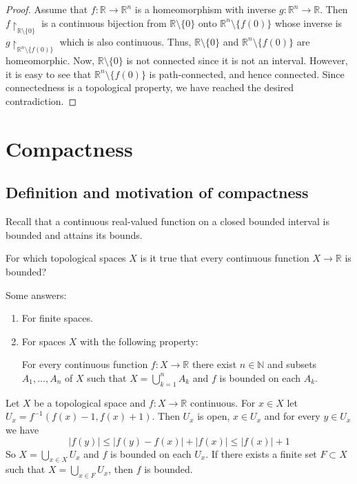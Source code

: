 \documentclass[a4paper]{article}
\begin{document}
\begin{proof}
    Assume that $f: \mathbb{R} \rightarrow \mathbb{R}^{n}$ is a homeomorphism with inverse $g: \mathbb{R}^{n} \rightarrow \mathbb{R}$. Then $f\restriction_{\mathbb{R} \setminus\{0\}}$ is a continuous bijection from $\mathbb{R} \setminus\{0\}$ onto $\mathbb{R}^{n} \setminus\{f(0)\}$ whose inverse is $g\restriction_{\mathbb{R}^{n} \setminus\{f(0)\}}$ which is also continuous. Thus, $\mathbb{R} \setminus\{0\}$ and $\mathbb{R}^{n} \setminus\{f(0)\}$ are homeomorphic. Now, $\mathbb{R} \setminus\{0\}$ is not connected since it is not an interval. However, it is easy to see that $\mathbb{R}^{n} \setminus\{f(0)\}$ is path-connected, and hence connected. Since connectedness is a topological property, we have reached the desired contradiction.
\end{proof}

\section{Compactness}
\subsection{Definition and motivation of compactness}
Recall that a continuous real-valued function on a closed bounded interval is bounded and attains its bounds.

\begin{sque}
    For which topological spaces $X$ is it true that every continuous function $X \rightarrow \mathbb{R}$ is bounded?
\end{sque}

Some answers:

\begin{enumerate}
  \item For finite spaces.

  \item For spaces $X$ with the following property:

  For every continuous function $f: X \rightarrow \mathbb{R}$ there exist $n \in \mathbb{N}$ and subsets $A_{1}, \ldots, A_{n}$ of $X$ such that $X=\bigcup_{k=1}^{n} A_{k}$ and $f$ is bounded on each $A_{k}$.
\end{enumerate}

\begin{note}
    Let $X$ be a topological space and $f: X \rightarrow \mathbb{R}$ continuous. For $x \in X$ let $U_{x}=f^{-1}(f(x)-1, f(x)+1)$. Then $U_{x}$ is open, $x \in U_{x}$ and for every $y \in U_{x}$ we have
    $$
    |f(y)| \leqslant|f(y)-f(x)|+|f(x)| \leqslant|f(x)|+1
    $$
    So $X=\bigcup_{x \in X} U_{x}$ and $f$ is bounded on each $U_{x}$. If there exists a finite set $F \subset X$ such that $X=\bigcup_{x \in F} U_{x}$, then $f$ is bounded.
\end{note}
\end{document}
